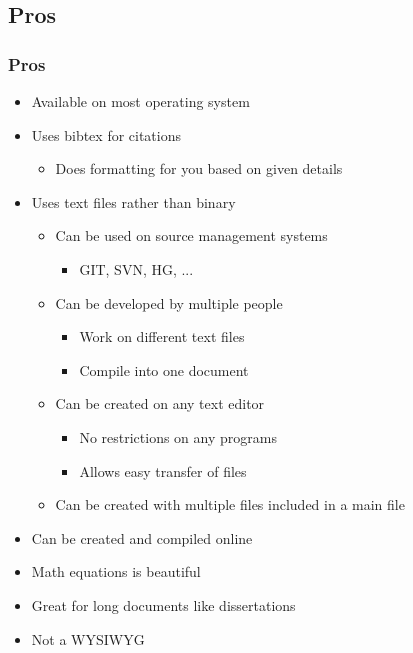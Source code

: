 \subsection{Pros}

\begin{frame}[allowframebreaks=0.8]
\frametitle{Pros}
    \begin{itemize}
        \item Available on most operating system
        \item Uses bibtex for citations
        \begin{itemize}
            \item Does formatting for you based on given details
        \end{itemize}
        \framebreak
        \item Uses text files rather than binary
        \begin{itemize}
            \item Can be used on source management systems
            \begin{itemize}
                \item GIT, SVN, HG, ...
            \end{itemize}
            \item Can be developed by multiple people
            \begin{itemize}
                \item Work on different text files
                \item Compile into one document
            \end{itemize}
            \item Can be created on any text editor
            \begin{itemize}
                \item No restrictions on any programs
                \item Allows easy transfer of files
            \end{itemize}
            \item Can be created with multiple files included in a main file
        \end{itemize}
        \framebreak
        \item Can be created and compiled online
        \item Math equations is beautiful
        \item Great for long documents like dissertations
        \item Not a WYSIWYG
    \end{itemize}
\end{frame}



